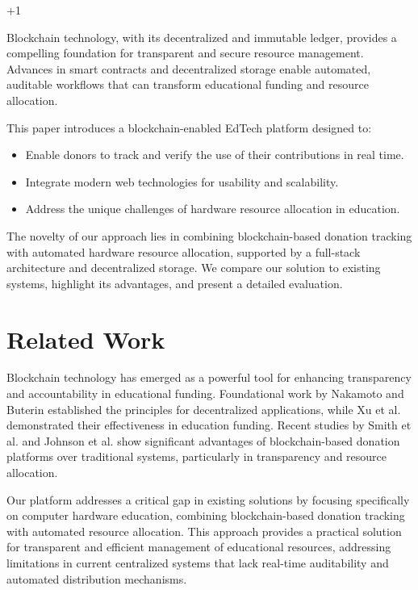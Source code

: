 +1\documentclass[conference]{IEEEtran}
\begin{document}
Blockchain technology, with its decentralized and immutable ledger, provides a compelling foundation for transparent and secure resource management. Advances in smart contracts and decentralized storage enable automated, auditable workflows that can transform educational funding and resource allocation.

This paper introduces a blockchain-enabled EdTech platform designed to:
\begin{itemize}
    \item Enable donors to track and verify the use of their contributions in real time.
    \item Integrate modern web technologies for usability and scalability.
    \item Address the unique challenges of hardware resource allocation in education.
\end{itemize}

The novelty of our approach lies in combining blockchain-based donation tracking with automated hardware resource allocation, supported by a full-stack architecture and decentralized storage. We compare our solution to existing systems, highlight its advantages, and present a detailed evaluation.

\section{Related Work}
Blockchain technology has emerged as a powerful tool for enhancing transparency and accountability in educational funding. Foundational work by Nakamoto \cite{b1} and Buterin \cite{b2} established the principles for decentralized applications, while Xu et al.\cite{b3} demonstrated their effectiveness in education funding. Recent studies by Smith et al. \cite{b12} and Johnson et al. \cite{b13} show significant advantages of blockchain-based donation platforms over traditional systems, particularly in transparency and resource allocation.

Our platform addresses a critical gap in existing solutions by focusing specifically on computer hardware education, combining blockchain-based donation tracking with automated resource allocation. This approach provides a practical solution for transparent and efficient management of educational resources, addressing limitations in current centralized systems that lack real-time auditability and automated distribution mechanisms.

\end{document}
